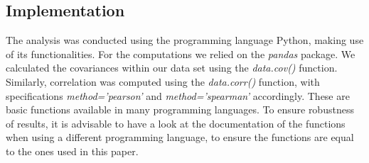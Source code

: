 \subsection{Implementation}
The analysis was conducted using the programming language Python, making use of its functionalities. For the computations we relied on the \emph{pandas} package. We calculated the covariances within our data set using the \emph{data.cov()} function. Similarly, correlation was computed using the \emph{data.corr()} function, with specifications \emph{method='pearson'} and \emph{method='spearman'} accordingly. These are basic functions available in many programming languages. To ensure robustness of results, it is advisable to have a look at the documentation of the functions when using a different programming language, to ensure the functions are equal to the ones used in this paper.
